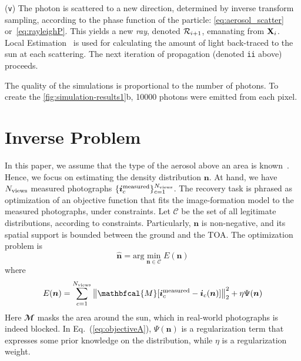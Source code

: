 \documentclass[10pt,letterpaper]{article}
\newcommand{\argmin}{\mathrm{arg}\min}
\newcommand{\vect}[1]{\bm{#1}}
\newcommand{\MaskSun}{\mathbfcal{M}}
\newcommand{\DistSet}{\mathcal{C}}
\newcommand{\DistUnknown}{\vect{n}}
\newcommand{\DistEstimated}{\hat{\vect{n}}}
\newcommand{\CostFunc}[1]{E(#1)}
\begin{document}
\noindent ({\tt v}) The photon is scattered to a new direction,
determined by inverse transform sampling, according to the phase
function of the particle: \cref{eq:aerosol_scatter}
or~\cref{eq:rayleighP}. This yields a new {\em ray}, denoted ${\cal
  R}_{i+1}$, emanating from ${\bf X}_{i}$. Local
Estimation~\cite{marshak20053d} is used for calculating the amount of
light back-traced to the sun at each scattering. The next iteration of
propagation (denoted {\tt ii} above) proceeds.

The quality of the simulations is proportional to the number of
photons. To create the \cref{fig:simulation-results1}b, \num{10000}
photons were emitted from each pixel.


\section{Inverse Problem}
\label{sec:inverse-problem}

In this paper, we assume that the type of the aerosol above an area is
known~\cite{Martonchik2009}. Hence, we focus on estimating the density
distribution $\DistUnknown$.  At hand, we have $N_{\rm views}$
measured photographs $\{ {\bm i}^{\rm measured}_c\}_{c=1}^{N_{\rm
    views}}$. The recovery task is phrased as optimization of an
objective function that fits the image-formation model to the measured
photographs, under constraints. Let $\DistSet$ be the set of all
legitimate distributions, according to constraints.  Particularly,
$\DistUnknown$ is non-negative, and its spatial support is bounded
between the ground and the TOA. The optimization problem is
\begin{equation}
  \label{eq:minobjectiveA}
  \DistEstimated =
  \argmin_{\DistUnknown \in \DistSet} \CostFunc{\DistUnknown}
\end{equation}
where
\begin{equation}
  \label{eq:objectiveA}
  \CostFunc{\DistUnknown}
  = \sum_{c=1}^{N_{\rm views}}
  \left\| 
    \MaskSun[{\bm i}^{\rm measured}_c - {\bm i}_c({\bm n})]
  \right\|^2_2
  + \eta \Psi({\bm n})
\end{equation}
Here $\MaskSun$ masks the area around the sun, which in real-world
photographs is indeed blocked. %
In Eq.~(\ref{eq:objectiveA}), $\Psi({\bm n})$ is a regularization term
that expresses some prior knowledge on the distribution, while $\eta$
is a regularization weight.
\end{document}
